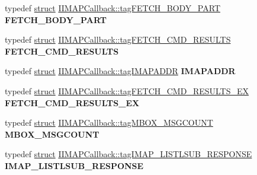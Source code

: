 \begin{DoxyCompactItemize}
typedef \hyperlink{interfacestruct}{struct} \hyperlink{struct_i_i_m_a_p_callback_1_1tag_f_e_t_c_h___b_o_d_y___p_a_r_t}{I\+I\+M\+A\+P\+Callback\+::tag\+F\+E\+T\+C\+H\+\_\+\+B\+O\+D\+Y\+\_\+\+P\+A\+RT} {\bfseries F\+E\+T\+C\+H\+\_\+\+B\+O\+D\+Y\+\_\+\+P\+A\+RT}
\item 
\mbox{\label{interface_i_i_m_a_p_callback_aa21025ac1aa2001d568e41e59dc8c930}} 
typedef \hyperlink{interfacestruct}{struct} \hyperlink{struct_i_i_m_a_p_callback_1_1tag_f_e_t_c_h___c_m_d___r_e_s_u_l_t_s}{I\+I\+M\+A\+P\+Callback\+::tag\+F\+E\+T\+C\+H\+\_\+\+C\+M\+D\+\_\+\+R\+E\+S\+U\+L\+TS} {\bfseries F\+E\+T\+C\+H\+\_\+\+C\+M\+D\+\_\+\+R\+E\+S\+U\+L\+TS}
\item 
\mbox{\label{interface_i_i_m_a_p_callback_a5079163b8153b4aa009cf0102da306bf}} 
typedef \hyperlink{interfacestruct}{struct} \hyperlink{struct_i_i_m_a_p_callback_1_1tag_i_m_a_p_a_d_d_r}{I\+I\+M\+A\+P\+Callback\+::tag\+I\+M\+A\+P\+A\+D\+DR} {\bfseries I\+M\+A\+P\+A\+D\+DR}
\item 
\mbox{\label{interface_i_i_m_a_p_callback_af1e43492d84a43dbd86a865b66b750bb}} 
typedef \hyperlink{interfacestruct}{struct} \hyperlink{struct_i_i_m_a_p_callback_1_1tag_f_e_t_c_h___c_m_d___r_e_s_u_l_t_s___e_x}{I\+I\+M\+A\+P\+Callback\+::tag\+F\+E\+T\+C\+H\+\_\+\+C\+M\+D\+\_\+\+R\+E\+S\+U\+L\+T\+S\+\_\+\+EX} {\bfseries F\+E\+T\+C\+H\+\_\+\+C\+M\+D\+\_\+\+R\+E\+S\+U\+L\+T\+S\+\_\+\+EX}
\item 
\mbox{\label{interface_i_i_m_a_p_callback_a3f8a6a798bd2f7d98865ecdebb023b34}} 
typedef \hyperlink{interfacestruct}{struct} \hyperlink{struct_i_i_m_a_p_callback_1_1tag_m_b_o_x___m_s_g_c_o_u_n_t}{I\+I\+M\+A\+P\+Callback\+::tag\+M\+B\+O\+X\+\_\+\+M\+S\+G\+C\+O\+U\+NT} {\bfseries M\+B\+O\+X\+\_\+\+M\+S\+G\+C\+O\+U\+NT}
\item 
\mbox{\label{interface_i_i_m_a_p_callback_a26527849675f2c58a1423b25ba338b46}} 
typedef \hyperlink{interfacestruct}{struct} \hyperlink{struct_i_i_m_a_p_callback_1_1tag_i_m_a_p___l_i_s_t_l_s_u_b___r_e_s_p_o_n_s_e}{I\+I\+M\+A\+P\+Callback\+::tag\+I\+M\+A\+P\+\_\+\+L\+I\+S\+T\+L\+S\+U\+B\+\_\+\+R\+E\+S\+P\+O\+N\+SE} {\bfseries I\+M\+A\+P\+\_\+\+L\+I\+S\+T\+L\+S\+U\+B\+\_\+\+R\+E\+S\+P\+O\+N\+SE}
\item 

\end{DoxyCompactItemize}
